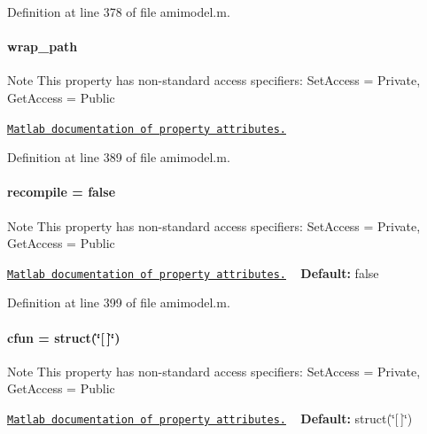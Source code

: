 Definition at line 378 of file amimodel.\+m.

\hypertarget{classamimodel_a0b316a20054ba282555674d939a82406}{}
\paragraph[{wrap\+\_\+path}]{\setlength{\rightskip}{0pt plus 5cm}wrap\+\_\+path}\label{classamimodel_a0b316a20054ba282555674d939a82406}
\begin{DoxyNote}{Note}
This property has non-\/standard access specifiers\+: {\ttfamily Set\+Access = Private, Get\+Access = Public} 

\href{http://www.mathworks.com/help/matlab/matlab_oop/property-attributes.html}{\tt Matlab documentation of property attributes.} 
\end{DoxyNote}


Definition at line 389 of file amimodel.\+m.

\hypertarget{classamimodel_a8d2e824e03e32034b634a7c48f2a26c6}{}
\paragraph[{recompile}]{\setlength{\rightskip}{0pt plus 5cm}recompile = false}\label{classamimodel_a8d2e824e03e32034b634a7c48f2a26c6}
\begin{DoxyNote}{Note}
This property has non-\/standard access specifiers\+: {\ttfamily Set\+Access = Private, Get\+Access = Public} 

\href{http://www.mathworks.com/help/matlab/matlab_oop/property-attributes.html}{\tt Matlab documentation of property attributes.} ~\newline
{\bfseries Default\+:} false 
\end{DoxyNote}


Definition at line 399 of file amimodel.\+m.

\hypertarget{classamimodel_afec809c626a350367485aa6aaea6b585}{}
\paragraph[{cfun}]{\setlength{\rightskip}{0pt plus 5cm}cfun = struct(\char`\"{}\mbox{[}$\,$\mbox{]}\char`\"{})}\label{classamimodel_afec809c626a350367485aa6aaea6b585}
\begin{DoxyNote}{Note}
This property has non-\/standard access specifiers\+: {\ttfamily Set\+Access = Private, Get\+Access = Public} 

\href{http://www.mathworks.com/help/matlab/matlab_oop/property-attributes.html}{\tt Matlab documentation of property attributes.} ~\newline
{\bfseries Default\+:} struct(\char`\"{}\mbox{[}$\,$\mbox{]}\char`\"{}) 
\end{DoxyNote}


